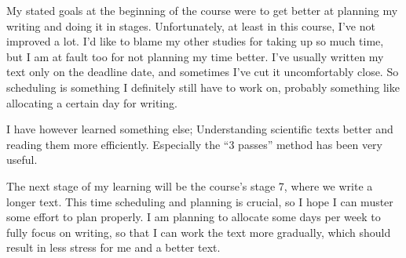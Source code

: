 My stated goals at the beginning of the course were to get better at planning
my writing and doing it in stages. Unfortunately, at least in this course, I've
not improved a lot. I'd like to blame my other studies for taking up so much
time, but I am at fault too for not planning my time better. I've usually
written my text only on the deadline date, and sometimes I've cut it
uncomfortably close. So scheduling is something I definitely still have to work
on, probably something like allocating a certain day for writing.

I have however learned something else; Understanding scientific texts better
and reading them more efficiently. Especially the ``3 passes'' method has been
very useful.

The next stage of my learning will be the course's stage 7, where we write a
longer text. This time scheduling and planning is crucial, so I hope I can
muster some effort to plan properly. I am planning to allocate some days per
week to fully focus on writing, so that I can work the text more gradually,
which should result in less stress for me and a better text.

